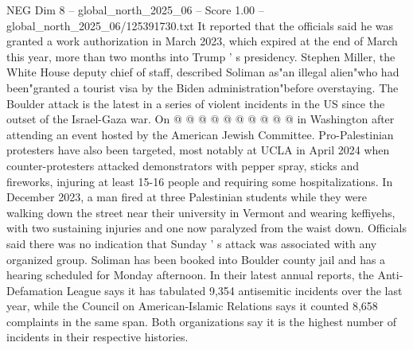 \begin{textsample}{NEG Dim 8 – global\_north\_2025\_06 – Score 1.00 – global\_north\_2025\_06/125391730.txt}
It reported that the officials said he was granted a work authorization in March 2023, which expired at the end of March this year, more than two months into Trump ' s presidency.
Stephen Miller, the White House deputy chief of staff, described Soliman as"an illegal alien"who had been"granted a tourist visa by the Biden administration"before overstaying.
The Boulder attack is the latest in a series of violent incidents in the US since the outset of the Israel-Gaza war.
On @ @ @ @ @ @ @ @ @ @ in Washington after attending an event hosted by the American Jewish Committee.
Pro-Palestinian protesters have also been targeted, most notably at UCLA in April 2024 when counter-protesters attacked demonstrators with pepper spray, sticks and fireworks, injuring at least 15-16 people and requiring some hospitalizations.
In December 2023, a man fired at three Palestinian students while they were walking down the street near their university in Vermont and wearing keffiyehs, with two sustaining injuries and one now paralyzed from the waist down.
Officials said there was no indication that Sunday ' s attack was associated with any organized group.
Soliman has been booked into Boulder county jail and has a hearing scheduled for Monday afternoon.
In their latest annual reports, the Anti-Defamation League says it has tabulated 9,354 antisemitic incidents over the last year, while the Council on American-Islamic Relations says it counted 8,658 complaints in the same span.
Both organizations say it is the highest number of incidents in their respective histories.

\end{textsample}
